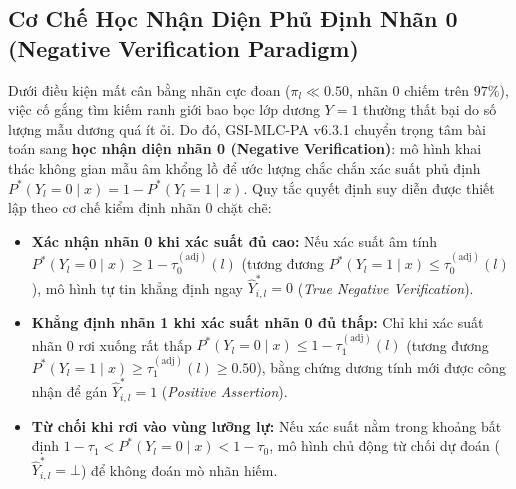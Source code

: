 \documentclass[10pt,a4paper,twoside]{article}
\begin{document}
\subsection{Cơ Chế Học Nhận Diện Phủ Định Nhãn 0 (Negative Verification Paradigm)}
Dưới điều kiện mất cân bằng nhãn cực đoan ($\pi_l \ll 0.50$, nhãn $0$ chiếm trên $97\%$), việc cố gắng tìm kiếm ranh giới bao bọc lớp dương $Y=1$ thường thất bại do số lượng mẫu dương quá ít ỏi. Do đó, GSI-MLC-PA v6.3.1 chuyển trọng tâm bài toán sang \textbf{học nhận diện nhãn 0 (Negative Verification)}: mô hình khai thác không gian mẫu âm khổng lồ để ước lượng chắc chắn xác suất phủ định $P^*(Y_l = 0 \mid x) = 1 - P^*(Y_l = 1 \mid x)$. Quy tắc quyết định suy diễn được thiết lập theo cơ chế kiểm định nhãn 0 chặt chẽ:
\begin{itemize}[leftmargin=*]
    \item \textbf{Xác nhận nhãn 0 khi xác suất đủ cao:} Nếu xác suất âm tính $P^*(Y_l = 0 \mid x) \ge 1 - \tau_0^{(\text{adj})}(l)$ (tương đương $P^*(Y_l = 1 \mid x) \le \tau_0^{(\text{adj})}(l)$), mô hình tự tin khẳng định ngay $\hat{Y}^*_{i, l} = 0$ (\textit{True Negative Verification}).
    \item \textbf{Khẳng định nhãn 1 khi xác suất nhãn 0 đủ thấp:} Chỉ khi xác suất nhãn 0 rơi xuống rất thấp $P^*(Y_l = 0 \mid x) \le 1 - \tau_1^{(\text{adj})}(l)$ (tương đương $P^*(Y_l = 1 \mid x) \ge \tau_1^{(\text{adj})}(l) \ge 0.50$), bằng chứng dương tính mới được công nhận để gán $\hat{Y}^*_{i, l} = 1$ (\textit{Positive Assertion}).
    \item \textbf{Từ chối khi rơi vào vùng lưỡng lự:} Nếu xác suất nằm trong khoảng bất định $1 - \tau_1 < P^*(Y_l = 0 \mid x) < 1 - \tau_0$, mô hình chủ động từ chối dự đoán ($\hat{Y}^*_{i, l} = \bot$) để không đoán mò nhãn hiếm.
\end{itemize}
\end{document}
